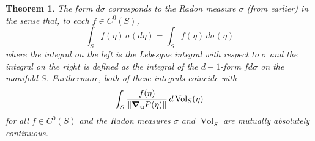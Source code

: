 \documentclass{article}
\theoremstyle{theorem}
\newtheorem{theorem}{Theorem}[section]
\newcommand{\Vol}{\operatorname{Vol}}
\begin{document}
\begin{theorem}
The form $d\sigma$ corresponds to the Radon measure $\sigma$ (from earlier) in the sense that, to each $f\in C^0(S)$,
\begin{equation*}
\int_S f(\eta)\,\sigma(d\eta)=\int_S f(\eta)\,d\sigma(\eta)
\end{equation*}
where the integral on the left is the Lebesgue integral with respect to $\sigma$ and the integral on the right is defined as the integral of the $d-1$-form $f d\sigma$ on the manifold $S$. Furthermore, both of these integrals coincide with 
\begin{equation*}
\int_S \frac{f(\eta)}{\norm{\grad_{\mathbf{u}}P(\eta)}}\,d\Vol_S(\eta)
\end{equation*}
for all $f\in C^0(S)$ and the Radon measures $\sigma$ and $\Vol_S$ are mutually absolutely continuous.
\end{theorem}
\end{document}
